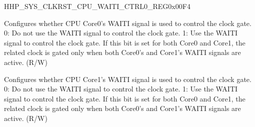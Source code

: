 
\begin{register}{H}{HP\_SYS\_CLKRST\_CPU\_WAITI\_CTRL0\_REG}{0x00F4}\label{regdesc:HPSYSCLKRSTCPUWAITICTRL0REG}
%
%
%
\regnewline%
\begin{regdesc}\begin{reglist}
\label{fielddesc:HPSYSCLKRSTREGCORE0WAITIICGEN}\item [HP\_SYS\_CLKRST\_REG\_CORE0\_WAITI\_ICG\_EN] Configures whether CPU Core0’s WAITI signal is used to control the clock gate.
0: Do not use the WAITI signal to control the clock gate.
1: Use the WAITI signal to control the clock gate.
If this bit is set for both Core0 and Core1, the related clock is gated only when both Core0’s and Core1’s WAITI signals are active. (R/W)
\label{fielddesc:HPSYSCLKRSTREGCORE1WAITIICGEN}\item [HP\_SYS\_CLKRST\_REG\_CORE1\_WAITI\_ICG\_EN] Configures whether CPU Core1’s WAITI signal is used to control the clock gate.
0: Do not use the WAITI signal to control the clock gate.
1: Use the WAITI signal to control the clock gate.
If this bit is set for both Core0 and Core1, the related clock is gated only when both Core0’s and Core1’s WAITI signals are active. (R/W)
\end{reglist}\end{regdesc}
\end{register}
